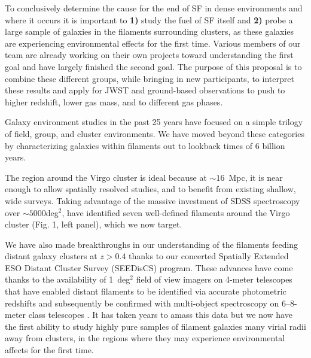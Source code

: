 \documentclass[11pt]{article}
\begin{document}
To conclusively determine the cause for the
end of SF in dense environments and where it occurs it is important to \textbf{1)} study
the fuel of SF itself and {\bf 2)} probe a large sample of galaxies in the filaments surrounding clusters, as these galaxies are experiencing environmental effects for the first time.  Various members of our team are already working on their own projects toward understanding the first goal and have largely finished the second goal.  The purpose of this proposal is to combine these different groups, while bringing in new participants, to interpret these results and apply for JWST and ground-based observations to push to higher redshift, lower gas mass, and to different gas phases.


  Galaxy environment studies in the past 25 years have focused on a simple trilogy of field, group, and cluster environments.  We have moved beyond these categories by characterizing galaxies within filaments out to lookback times of 6 billion years.

The region around the Virgo cluster is ideal because at $\sim 16$~Mpc,  it is near enough to allow spatially resolved studies, and to benefit from existing shallow, wide surveys. Taking advantage of the massive investment of SDSS spectroscopy over $\sim 5000$deg$^2$, \citet{Kim16} have identified seven well-defined filaments around the Virgo cluster (Fig. 1, left panel), which we now target.

We have also made breakthroughs in our understanding of the filaments feeding distant galaxy clusters at $z>0.4$ thanks to our concerted Spatially Extended ESO Distant Cluster Survey (SEEDisCS) program.  These advances have come thanks to the availability of 1~deg$^{2}$ field of view imagers on 4-meter telescopes that have enabled distant filaments to be identified via accurate photometric redshifts and subsequently be confirmed with multi-object spectroscopy on 6--8-meter class telescopes \citep[Fig. 1, right pax`nel;][]{Rerat17}.  It has taken years to amass this data but we now have the first ability to study highly pure samples of filament galaxies many virial radii away from clusters, in the regions where they may experience environmental affects for the first time.
\end{document}
